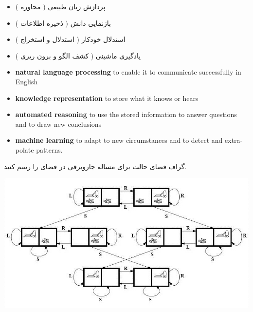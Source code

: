 \documentclass[12pt]{article}
\begin{document}
\begin{tcolorbox}
\begin{itemize}
	\item پردازش زبان طبیعی ( محاوره )
	\item بازنمایی دانش ( ذخیره اطلاعات )
	\item استدلال خودکار ( استدلال و استخراج )
	\item یادگیری ماشینی ( کشف الگو و برون ریزی )
\end{itemize}
\end{tcolorbox}


\begin{latin}
\begin{tcolorbox}
\begin{itemize}
	\item \textbf{natural language processing} to enable it to communicate successfully in English
	\item \textbf{knowledge representation} to store what it knows or hears
	\item \textbf{automated reasoning} to use the stored information to answer questions and to draw
new conclusions
	\item \textbf{machine learning} to adapt to new circumstances and to detect and extrapolate patterns.
\end{itemize}
\end{tcolorbox}
\end{latin}





\newpage
\vspace{20pt}
\noindent
گراف فضای حالت برای مساله جاروبرقی در فضای
 را رسم کنید.



\begin{center}
	\includegraphics[scale=0.8]{./The-state-space-of-the-Vacuum-World-domain.jpg}
\end{center}
\end{document}
